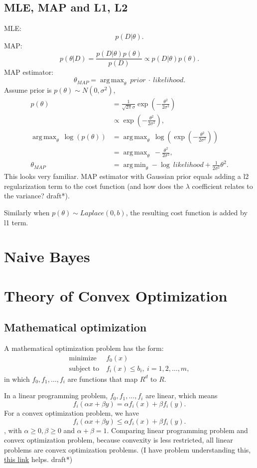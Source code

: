 \documentclass{report}
\DeclareMathOperator*{\argmax}{arg\,max}
\DeclareMathOperator*{\argmin}{arg\,min}
\begin{document}
\section{MLE, MAP and L1, L2}
MLE: \[
	p(D|\theta)
.\] 
MAP:
\[
	p(\theta|D) = \frac{p(D|\theta)p(\theta)}{p(D)} \propto p(D|\theta)p(\theta)
.\] 
MAP estimator: \[
	\theta_{MAP} = \argmax_{\theta}\ prior\ \cdot\ likelihood
.\] 
Assume prior is $p(\theta) \sim N(0, \sigma^2)$,
\begin{align*}
	p(\theta) &= \frac{1}{\sqrt{2\pi} \sigma} \exp \left( -\frac{\theta^2}{2\sigma^2} \right) \\
		  &\propto \exp \left( -\frac{
		  \theta^2}{2\sigma^2} \right), \\
		  \argmax_{\theta}\ \log(p(\theta)) &= \argmax_{\theta}\ \log \left( \exp \left( -\frac{\theta^2}{2\sigma^2} \right) \right) \\ 
 &= \argmax_{\theta}\ -\frac{\theta^2}{2\sigma^2}, \\
		  \theta_{MAP} &= \argmin_{\theta} - \log \ likelihood +  \frac{1}{2\sigma^2} \theta^2
.\end{align*}
This looks very familiar. MAP estimator with Gaussian prior equals adding a l2 regularization term to the cost function (and how does the $\lambda$ coefficient relates to the variance? draft*).

Similarly when $p(\theta) \sim Laplace(0, b)$, the resulting cost function is added by l1 term.

\chapter{Naive Bayes}
\chapter{Theory of Convex Optimization}
\section{Mathematical optimization}
A mathematical optimization problem has the form:
\begin{align*}
	\text{minimize}\ &f_0(x) \\
	\text{subject to}\ &f_i(x) \le  b_i,\ i = 1,2,\ldots,m,
\end{align*}
in which $f_0, f_1, \ldots, f_i$ are functions that map $R^d$ to $R$.

In a linear programming problem,  $f_0, f_1, \ldots, f_i$ are linear, which means \[
	f_i(\alpha x + \beta y) = \alpha f_i(x) + \beta f_i(y).
\] For a convex optimization problem, we have \[
	f_i(\alpha x + \beta y) \le  \alpha f_i(x) + \beta f_i(y)
.\] , with $\alpha \ge 0, \beta \ge 0$ and $\alpha + \beta = 1$.
Comparing linear programming problem and convex optimization problem, because convexity is less restricted, all linear problems are convex optimization problems. (I have problem understanding this, \href{https://math.stackexchange.com/q/4231709/727493}{this link} helps. draft*)
\end{document}
